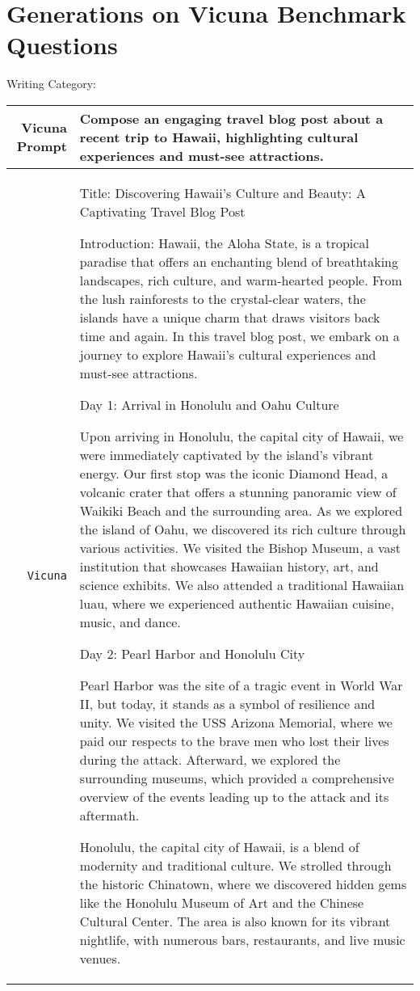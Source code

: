 \documentclass{article}
\begin{document}
{\section{Generations on Vicuna Benchmark Questions}

Writing Category:

{  \footnotesize \begin{tabularx}{\linewidth}{r X} \toprule Vicuna Prompt  & {\bf Compose an engaging travel blog post about a recent trip to Hawaii, highlighting cultural experiences and must-see attractions.}
\\
 \midrule \texttt{Vicuna}  &
Title: Discovering Hawaii's Culture and Beauty: A Captivating Travel Blog Post

Introduction:
Hawaii, the Aloha State, is a tropical paradise that offers an enchanting blend of breathtaking landscapes, rich culture, and warm-hearted people. From the lush rainforests to the crystal-clear waters, the islands have a unique charm that draws visitors back time and again. In this travel blog post, we embark on a journey to explore Hawaii's cultural experiences and must-see attractions.

Day 1: Arrival in Honolulu and Oahu Culture

Upon arriving in Honolulu, the capital city of Hawaii, we were immediately captivated by the island's vibrant energy. Our first stop was the iconic Diamond Head, a volcanic crater that offers a stunning panoramic view of Waikiki Beach and the surrounding area. As we explored the island of Oahu, we discovered its rich culture through various activities. We visited the Bishop Museum, a vast institution that showcases Hawaiian history, art, and science exhibits. We also attended a traditional Hawaiian luau, where we experienced authentic Hawaiian cuisine, music, and dance.

Day 2: Pearl Harbor and Honolulu City

Pearl Harbor was the site of a tragic event in World War II, but today, it stands as a symbol of resilience and unity. We visited the USS Arizona Memorial, where we paid our respects to the brave men who lost their lives during the attack. Afterward, we explored the surrounding museums, which provided a comprehensive overview of the events leading up to the attack and its aftermath.

Honolulu, the capital city of Hawaii, is a blend of modernity and traditional culture. We strolled through the historic Chinatown, where we discovered hidden gems like the Honolulu Museum of Art and the Chinese Cultural Center. The area is also known for its vibrant nightlife, with numerous bars, restaurants, and live music venues.


\end{tabularx}}}
\end{document}
